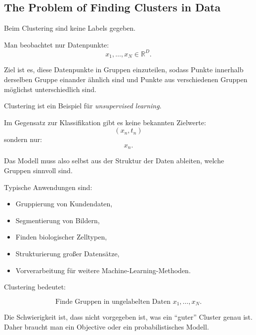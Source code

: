 \documentclass[11pt,a4paper]{scrartcl}
\begin{document}
\subsection{The Problem of Finding Clusters in Data}

\begin{notebox}
    Beim Clustering sind keine Labels gegeben.

    Man beobachtet nur Datenpunkte:
    \[
        x_1,\dots,x_N \in \mathbb{R}^D.
    \]

    Ziel ist es, diese Datenpunkte in Gruppen einzuteilen, sodass Punkte
    innerhalb derselben Gruppe einander ähnlich sind und Punkte aus
    verschiedenen Gruppen möglichst unterschiedlich sind.
\end{notebox}

\begin{solutionbox}
    Clustering ist ein Beispiel für \emph{unsupervised learning}.

    Im Gegensatz zur Klassifikation gibt es keine bekannten Zielwerte:
    \[
        (x_n,t_n)
    \]
    sondern nur:
    \[
        x_n.
    \]

    Das Modell muss also selbst aus der Struktur der Daten ableiten, welche
    Gruppen sinnvoll sind.

    Typische Anwendungen sind:

    \begin{itemize}
        \item Gruppierung von Kundendaten,
        \item Segmentierung von Bildern,
        \item Finden biologischer Zelltypen,
        \item Strukturierung großer Datensätze,
        \item Vorverarbeitung für weitere Machine-Learning-Methoden.
    \end{itemize}
\end{solutionbox}

\begin{answerbox}
    Clustering bedeutet:

    \[
        \boxed{
            \text{Finde Gruppen in ungelabelten Daten } x_1,\dots,x_N.
        }
    \]

    Die Schwierigkeit ist, dass nicht vorgegeben ist, was ein ``guter'' Cluster
    genau ist. Daher braucht man ein Objective oder ein probabilistisches Modell.
\end{answerbox}
\end{document}
